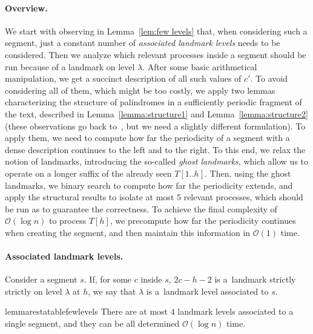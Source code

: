 \documentclass{article}[11pt,letter]
\newcommand{\bigo}{\mathcal{O}}
\newcommand{\head}{h}
\newcommand{\level}{\lambda}
\begin{document}
\paragraph{Overview.}   We start with observing in Lemma~\ref{lem:few levels} that, when considering such a segment, just a constant number of \emph{associated landmark
levels} needs to be considered. Then we analyze which relevant processes inside a segment should be run because of a landmark on level $\level$.
After some basic arithmetical manipulation, we get a succinct description of all such values of $c'$. To avoid considering all of them, which
might be too costly, we apply two lemmas characterizing the structure of palindromes in a sufficiently periodic fragment of the text,
described in Lemma~\ref{lemma:structure1} and Lemma~\ref{lemma:structure2} (these observations go back to~\cite{Apostolico}, but we need
a slightly different formulation). To apply them, we need to compute how far the periodicity of a segment with a dense description continues
to the left and to the right. To this end, we relax the notion of landmarks, introducing the so-called \emph{ghost landmarks}, which allow us to
operate on a longer suffix of the already seen $T[1..\head]$. Then, using the ghost landmarks, we binary search to compute how far
the periodicity extends, and apply the structural results to isolate at most $5$ relevant processes, which should be run as to guarantee
the correctness. To achieve the final complexity of $\bigo(\log n)$  to process $T[h]$, we precompute how far the
periodicity continues when creating the segment, and then maintain this information in $\bigo(1)$ time.



\paragraph{Associated landmark levels.} Consider a segment $s$. If, for some $c$ inside $s$, $2c-\head-2$ is a~landmark strictly strictly on
level $\level$ at $h$, we say that $\level$ is a~landmark level associated to $s$.

\begin{restatable}{lemma}{restatablefewlevels}
\label{lem:few levels}
There are at most $4$ landmark levels associated to a single segment, and they can be all determined
$\bigo(\log n)$ time.
\end{restatable}
\end{document}
